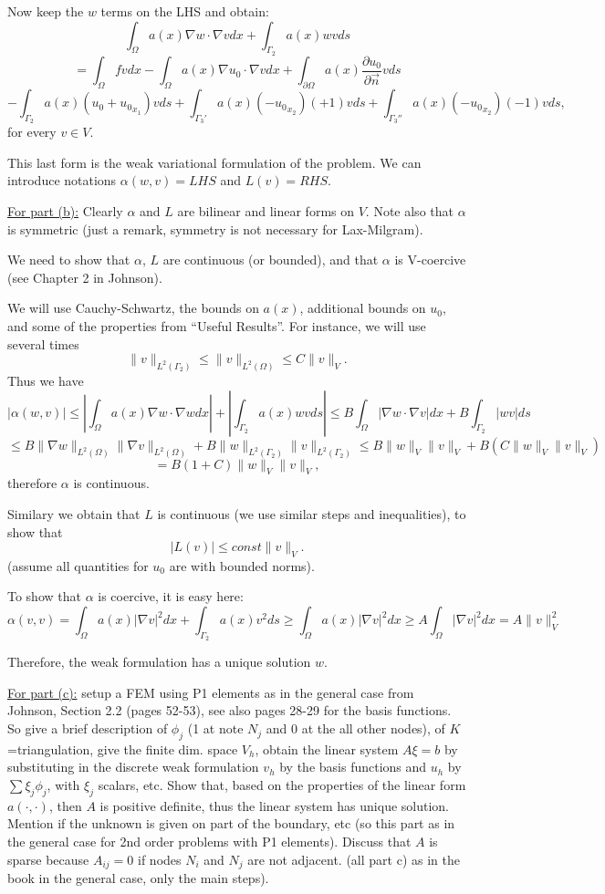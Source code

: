 \documentclass[12pt]{article}
\begin{document}
Now keep the $w$ terms on the LHS and obtain: 
$$\int_{\Omega}a(x)\nabla w\cdot\nabla vdx+\int_{\Gamma_2}a(x)wvds$$
$$=\int_{\Omega}fvdx -\int_{\Omega}a(x)\nabla u_0\cdot\nabla vdx+\int_{\partial\Omega}a(x)\frac{\partial u_0}{\partial \vec{n}}vds $$
$$-\int_{\Gamma_2}a(x)(u_0+{u_0}_{x_1})vds+\int_{\Gamma_3'}a(x)(-{u_0}_{x_2})(+1)vds
+\int_{\Gamma_3''}a(x)(-{u_0}_{x_2})(-1)vds,$$
for every $v\in V$. 

This last form is the weak variational formulation of the problem. We can introduce notations $\alpha(w,v)=LHS$ and $L(v)=RHS$.  

\underline{For part (b):} Clearly $\alpha$ and $L$ are bilinear and linear forms on $V$. Note also that $\alpha$ is symmetric (just a remark, symmetry is not necessary for Lax-Milgram). 

We need to show that $\alpha$, $L$ are continuous (or bounded), and that $\alpha$ is V-coercive (see Chapter 2 in Johnson). 

We will use Cauchy-Schwartz, the bounds on $a(x)$, additional bounds on $u_0$, and some of the properties from ``Useful Results''. 
For instance, we will use several times 
$$\|v\|_{L^2(\Gamma_2)}\leq \|v\|_{L^2(\Omega)} \leq C\|v\|_{V}.$$
Thus we have 
$$|\alpha(w,v)|\leq |\int_{\Omega}a(x)\nabla w\cdot\nabla wdx|+|\int_{\Gamma_2}a(x)wvds|\leq B\int_{\Omega}|\nabla w\cdot \nabla v|dx+B\int_{\Gamma_2}|wv|ds$$
$$\leq B\|\nabla w\|_{L^2(\Omega)}\|\nabla v\|_{L^2(\Omega)}+B\|w\|_{L^2(\Gamma_2)}\|v\|_{L^2(\Gamma_2)}\leq B\|w\|_V\|v\|_V+B(C\|w\|_V\|v\|_V)$$
$$=B(1+C)\|w\|_V\|v\|_V,$$
therefore $\alpha$ is continuous. 

Similary we obtain that $L$ is continuous (we use similar steps and inequalities), to show that 
$$|L(v)|\leq const\|v\|_V.$$ 
(assume all quantities for $u_0$ are with bounded norms). 

To show that $\alpha$ is coercive, it is easy here:
$$\alpha(v,v)=\int_{\Omega}a(x)|\nabla v|^2dx+\int_{\Gamma_2}a(x)v^2ds\geq 
\int_{\Omega}a(x)|\nabla v|^2dx\geq A\int_{\Omega}|\nabla v|^2dx=A\|v\|_V^2$$

Therefore, the weak formulation has a unique solution $w$. 

\underline{For part (c):} setup a FEM using P1 elements as in the general case from Johnson, Section 2.2 (pages 52-53), see also pages 28-29 for the basis functions. 
So give a brief description of $\phi_{j}$ (1 at note $N_j$ and 0 at the all other nodes), of $K$=triangulation, give the finite dim. space $V_h$, obtain the linear system $A\xi=b$ by substituting in the discrete weak formulation $v_h$ by the basis functions and $u_h$ by $\sum \xi_j\phi_j$, with $\xi_j$ scalars, etc. Show that, based on the properties of the linear form $a(\cdot,\cdot)$, then $A$ is positive definite, thus the linear system has unique solution. Mention if the unknown is given on part of the boundary, etc (so this part as in the general case for 2nd order problems with P1 elements). Discuss that $A$ is sparse 
because $A_{ij}=0$ if nodes $N_i$ and $N_j$ are not adjacent. 
(all part c) as in the book in the general case, only the main steps).
\end{document}
